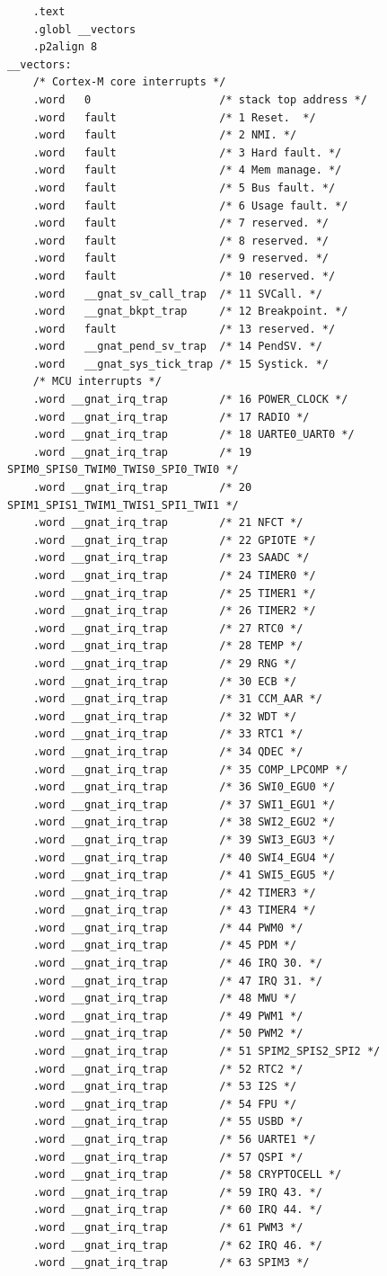 \documentclass{article}
\begin{document}
\begin{lstlisting}
	.text
	.globl __vectors
	.p2align 8
__vectors:
	/* Cortex-M core interrupts */
	.word   0                    /* stack top address */
	.word   fault                /* 1 Reset.  */
	.word   fault                /* 2 NMI. */
	.word   fault                /* 3 Hard fault. */
	.word   fault                /* 4 Mem manage. */
	.word   fault                /* 5 Bus fault. */
	.word   fault                /* 6 Usage fault. */
	.word   fault                /* 7 reserved. */
	.word   fault                /* 8 reserved. */
	.word   fault                /* 9 reserved. */
	.word   fault                /* 10 reserved. */
	.word   __gnat_sv_call_trap  /* 11 SVCall. */
	.word   __gnat_bkpt_trap     /* 12 Breakpoint. */
	.word   fault                /* 13 reserved. */
	.word   __gnat_pend_sv_trap  /* 14 PendSV. */
	.word   __gnat_sys_tick_trap /* 15 Systick. */
	/* MCU interrupts */
	.word __gnat_irq_trap        /* 16 POWER_CLOCK */
	.word __gnat_irq_trap        /* 17 RADIO */
	.word __gnat_irq_trap        /* 18 UARTE0_UART0 */
	.word __gnat_irq_trap        /* 19 SPIM0_SPIS0_TWIM0_TWIS0_SPI0_TWI0 */
	.word __gnat_irq_trap        /* 20 SPIM1_SPIS1_TWIM1_TWIS1_SPI1_TWI1 */
	.word __gnat_irq_trap        /* 21 NFCT */
	.word __gnat_irq_trap        /* 22 GPIOTE */
	.word __gnat_irq_trap        /* 23 SAADC */
	.word __gnat_irq_trap        /* 24 TIMER0 */
	.word __gnat_irq_trap        /* 25 TIMER1 */
	.word __gnat_irq_trap        /* 26 TIMER2 */
	.word __gnat_irq_trap        /* 27 RTC0 */
	.word __gnat_irq_trap        /* 28 TEMP */
	.word __gnat_irq_trap        /* 29 RNG */
	.word __gnat_irq_trap        /* 30 ECB */
	.word __gnat_irq_trap        /* 31 CCM_AAR */
	.word __gnat_irq_trap        /* 32 WDT */
	.word __gnat_irq_trap        /* 33 RTC1 */
	.word __gnat_irq_trap        /* 34 QDEC */
	.word __gnat_irq_trap        /* 35 COMP_LPCOMP */
	.word __gnat_irq_trap        /* 36 SWI0_EGU0 */
	.word __gnat_irq_trap        /* 37 SWI1_EGU1 */
	.word __gnat_irq_trap        /* 38 SWI2_EGU2 */
	.word __gnat_irq_trap        /* 39 SWI3_EGU3 */
	.word __gnat_irq_trap        /* 40 SWI4_EGU4 */
	.word __gnat_irq_trap        /* 41 SWI5_EGU5 */
	.word __gnat_irq_trap        /* 42 TIMER3 */
	.word __gnat_irq_trap        /* 43 TIMER4 */
	.word __gnat_irq_trap        /* 44 PWM0 */
	.word __gnat_irq_trap        /* 45 PDM */
	.word __gnat_irq_trap        /* 46 IRQ 30. */
	.word __gnat_irq_trap        /* 47 IRQ 31. */
	.word __gnat_irq_trap        /* 48 MWU */
	.word __gnat_irq_trap        /* 49 PWM1 */
	.word __gnat_irq_trap        /* 50 PWM2 */
	.word __gnat_irq_trap        /* 51 SPIM2_SPIS2_SPI2 */
	.word __gnat_irq_trap        /* 52 RTC2 */
	.word __gnat_irq_trap        /* 53 I2S */
	.word __gnat_irq_trap        /* 54 FPU */
	.word __gnat_irq_trap        /* 55 USBD */
	.word __gnat_irq_trap        /* 56 UARTE1 */
	.word __gnat_irq_trap        /* 57 QSPI */
	.word __gnat_irq_trap        /* 58 CRYPTOCELL */
	.word __gnat_irq_trap        /* 59 IRQ 43. */
	.word __gnat_irq_trap        /* 60 IRQ 44. */
	.word __gnat_irq_trap        /* 61 PWM3 */
	.word __gnat_irq_trap        /* 62 IRQ 46. */
	.word __gnat_irq_trap        /* 63 SPIM3 */


\end{lstlisting}
\end{document}
